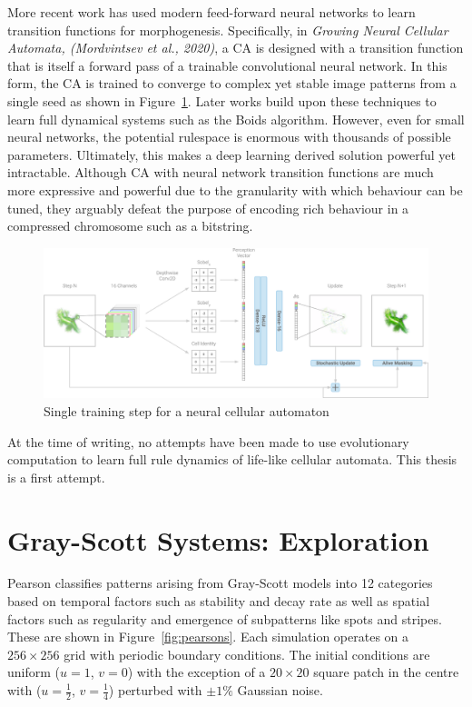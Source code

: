 More recent work has used modern feed-forward neural networks to learn transition functions for morphogenesis. Specifically, in \textit{Growing Neural Cellular Automata, (Mordvintsev et al., 2020)}\cite{mordvintsev2020growing}, a CA is designed with a transition function that is itself a forward pass of a trainable convolutional neural network. In this form, the CA is trained to converge to complex yet stable image patterns from a single seed as shown in Figure~\ref{fig:nca}. Later works build upon these techniques to learn full dynamical systems such as the Boids algorithm\cite{grattarola2021learning}. However, even for small neural networks, the potential rulespace is enormous with thousands of possible parameters. Ultimately, this makes a deep learning derived solution powerful yet intractable. Although CA with neural network transition functions are much more expressive and powerful due to the granularity with which behaviour can be tuned, they arguably defeat the purpose of encoding rich behaviour in a compressed chromosome such as a bitstring.\\

\begin{figure}[!h]
\centering
\includegraphics[width=\textwidth]{images/nca.png}
\caption{Single training step for a neural cellular automaton\cite{mordvintsev2020growing}}
\label{fig:nca}
\end{figure}

At the time of writing, no attempts have been made to use evolutionary computation to learn full rule dynamics of life-like cellular automata. This thesis is a first attempt.

\section{Gray-Scott Systems: Exploration} \label{sec: gs-exploration}

Pearson\cite{pearson1993complex} classifies patterns arising from Gray-Scott models into 12 categories  based on temporal factors such as stability and decay rate as well as spatial factors such as regularity and emergence of subpatterns like spots and stripes. These are shown in Figure~\ref{fig:pearsons}. Each simulation operates on a $256 \times 256$ grid with periodic boundary conditions. The initial conditions are uniform ($u = 1$, $v = 0$) with the exception of a $20 \times 20$ square patch in the centre with ($u=\frac{1}{2}$, $v=\frac{1}{4}$) perturbed with $\pm 1\%$ Gaussian noise.\\

